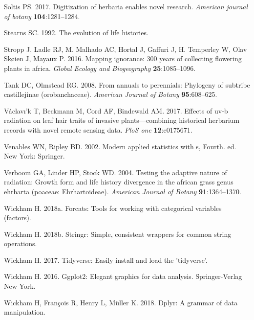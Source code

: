 \documentclass[man,floatsintext]{apa6}
\theoremstyle{definition}
\theoremstyle{definition}
\theoremstyle{definition}
\theoremstyle{remark}
\begin{document}
\leavevmode\hypertarget{ref-soltis2017digitization}{}%
Soltis PS. 2017. Digitization of herbaria enables novel research.
\emph{American journal of botany} \textbf{104}:1281--1284.

\leavevmode\hypertarget{ref-stearns1992evolution}{}%
Stearns SC. 1992. The evolution of life histories.

\leavevmode\hypertarget{ref-stropp2016mapping}{}%
Stropp J, Ladle RJ, M. Malhado AC, Hortal J, Gaffuri J, H. Temperley W,
Olav Skøien J, Mayaux P. 2016. Mapping ignorance: 300 years of
collecting flowering plants in africa. \emph{Global Ecology and
Biogeography} \textbf{25}:1085--1096.

\leavevmode\hypertarget{ref-tank2008annuals}{}%
Tank DC, Olmstead RG. 2008. From annuals to perennials: Phylogeny of
subtribe castillejinae (orobanchaceae). \emph{American Journal of
Botany} \textbf{95}:608--625.

\leavevmode\hypertarget{ref-vaclavik2017effects}{}%
Václavı'k T, Beckmann M, Cord AF, Bindewald AM. 2017. Effects of uv-b
radiation on leaf hair traits of invasive plants---combining historical
herbarium records with novel remote sensing data. \emph{PloS one}
\textbf{12}:e0175671.

\leavevmode\hypertarget{ref-R-MASS}{}%
Venables WN, Ripley BD. 2002. Modern applied statistics with s, Fourth.
ed. New York: Springer.

\leavevmode\hypertarget{ref-verboom2004testing}{}%
Verboom GA, Linder HP, Stock WD. 2004. Testing the adaptive nature of
radiation: Growth form and life history divergence in the african grass
genus ehrharta (poaceae: Ehrhartoideae). \emph{American Journal of
Botany} \textbf{91}:1364--1370.

\leavevmode\hypertarget{ref-R-forcats}{}%
Wickham H. 2018a. Forcats: Tools for working with categorical variables
(factors).

\leavevmode\hypertarget{ref-R-stringr}{}%
Wickham H. 2018b. Stringr: Simple, consistent wrappers for common string
operations.

\leavevmode\hypertarget{ref-R-tidyverse}{}%
Wickham H. 2017. Tidyverse: Easily install and load the 'tidyverse'.

\leavevmode\hypertarget{ref-R-ggplot2}{}%
Wickham H. 2016. Ggplot2: Elegant graphics for data analysis.
Springer-Verlag New York.

\leavevmode\hypertarget{ref-R-dplyr}{}%
Wickham H, François R, Henry L, Müller K. 2018. Dplyr: A grammar of data
manipulation.
\end{document}
